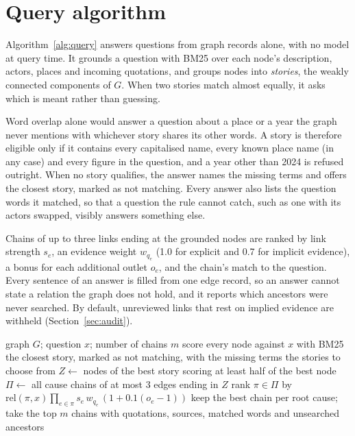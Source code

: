 \documentclass[pdflatex,sn-basic,lineno]{sn-jnl}
\theoremstyle{thmstylethree}
\theoremstyle{thmstyleone}
\begin{document}
\section{Query algorithm}\label{sec:query}

Algorithm~\ref{alg:query} answers questions from graph records alone, with no model at query time.
It grounds a question with BM25 \citep{bm25} over each node's description, actors, places and
incoming quotations, and groups nodes into \emph{stories}, the weakly connected components of $G$.
When two stories match almost equally, it asks which is meant rather than guessing.

Word overlap alone would answer a question about a place or a year the graph never mentions with
whichever story shares its other words. A story is therefore eligible only if it contains every
capitalised name, every known place name (in any case) and every figure in the question, and a
year other than 2024 is refused outright. When no story qualifies, the answer names the missing
terms and offers the closest story, marked as not matching. Every answer also lists the question
words it matched, so that a question the rule cannot catch, such as one with its actors swapped,
visibly answers something else.

Chains of up to three links ending at the grounded nodes are ranked by link strength $s_e$, an
evidence weight $w_{q_e}$ (1.0 for explicit and 0.7 for implicit evidence), a bonus for each
additional outlet $o_e$, and the chain's match to the question. Every sentence of an answer is
filled from one edge record, so an answer cannot state a relation the graph does not hold, and it
reports which ancestors were never searched. By default, unreviewed links that rest on implied
evidence are withheld (Section~\ref{sec:audit}).

\begin{algorithm}[!htbp]
\caption{Query: why did $x$ happen?}
\label{alg:query}
\small
\begin{algorithmic}[1]
\Require graph $G$; question $x$; number of chains $m$
\State score every node against $x$ with BM25 
  \State \Return the closest story, marked as not matching, with the missing terms
\EndIf
{}
  \State \Return the stories to choose from
\EndIf
\State $Z \gets$ nodes of the best story scoring at least half of the best node
\State $\Pi \gets$ all cause chains of at most 3 edges ending in $Z$
\State rank $\pi\in\Pi$ by $\mathrm{rel}(\pi,x)\prod_{e\in\pi} s_e\, w_{q_e}\,(1+0.1(o_e-1))$
\State keep the best chain per root cause; take the top $m$
\State \Return chains with quotations, sources, matched words and unsearched ancestors
\end{algorithmic}
\end{algorithm}
\end{document}
